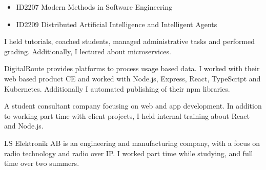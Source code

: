 \documentclass[10pt,a4paper]{altacv}
\begin{document}
\begin{itemize}
    \item ID2207 Modern Methods in Software Engineering
    \item ID2209 Distributed Artificial Intelligence and Intelligent Agents
\end{itemize}

I held tutorials, coached students, managed administrative tasks and performed grading. Additionally, I lectured about microservices. 

\divider

DigitalRoute provides platforms to process usage based data. I worked with their web based product CE and worked with Node.js, Express, React, TypeScript and Kubernetes. Additionally I automated publishing of their npm libraries.

\divider


A student consultant company focusing on web and app development. In addition to working part time with client projects, I held internal training about React and Node.js.

\divider

LS Elektronik AB is an engineering and manufacturing company, with a focus on radio technology and radio over IP. I worked part time while studying, and full time over two summers.



\end{document}

